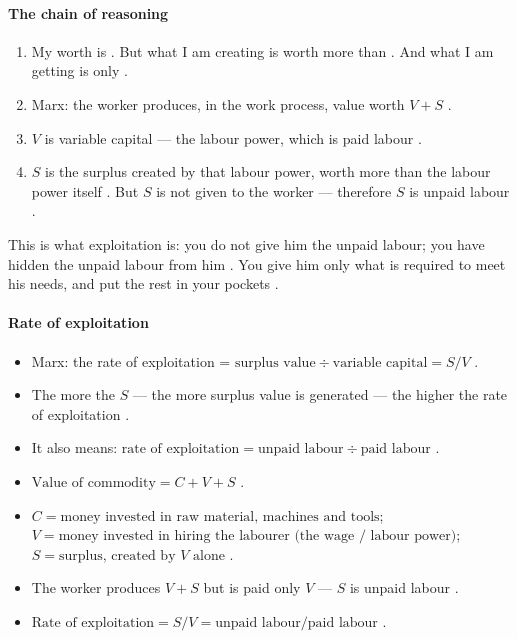 \paragraph{The chain of reasoning}
\begin{enumerate}
    \item My worth is  . But what I am creating is worth more than  . And what I am getting is only  .
    \item Marx: the worker produces, in the work process, value worth $V + S$ .
    \item $V$ is variable capital --- the labour power, which is paid labour .
    \item $S$ is the surplus created by that labour power, worth more than the labour power itself . But $S$ is not given to the worker --- therefore $S$ is unpaid labour .
\end{enumerate}

\begin{CriticalPoint}
This is what exploitation is: you do not give him the unpaid labour; you have hidden the unpaid labour from him . You give him only what is required to meet his needs, and put the rest in your pockets .
\end{CriticalPoint}

\paragraph{Rate of exploitation}
\begin{itemize}
    \item Marx: the rate of exploitation = $\text{surplus value} \div \text{variable capital} = S / V$ .
    \item The more the $S$ --- the more surplus value is generated --- the higher the rate of exploitation .
    \item It also means: $\text{rate of exploitation} = \text{unpaid labour} \div \text{paid labour}$ .
\end{itemize}

\begin{QuickRevision}
\begin{itemize}
    \item $\text{Value of commodity} = C + V + S$ .
    \item $C = \text{money invested in raw material, machines and tools}$; $V = \text{money invested in hiring the labourer (the wage / labour power)}$; $S = \text{surplus, created by } V \text{ alone}$ .
    \item The worker produces $V + S$ but is paid only $V$ --- $S$ is unpaid labour .
    \item $\text{Rate of exploitation} = S / V = \text{unpaid labour} / \text{paid labour}$ .
\end{itemize}
\end{QuickRevision}

